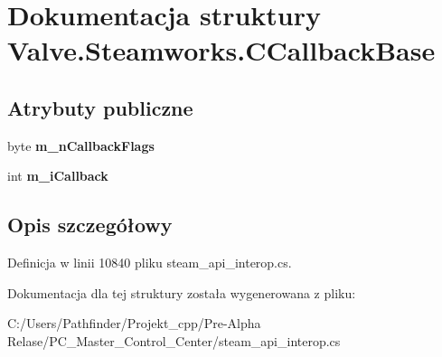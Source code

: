 \hypertarget{struct_valve_1_1_steamworks_1_1_c_callback_base}{}\section{Dokumentacja struktury Valve.\+Steamworks.\+C\+Callback\+Base}
\label{struct_valve_1_1_steamworks_1_1_c_callback_base}
\subsection*{Atrybuty publiczne}
\begin{DoxyCompactItemize}
\item 
\mbox{\label{struct_valve_1_1_steamworks_1_1_c_callback_base_a96bf2321a7c7d75c528d671eca3024c7}} 
byte {\bfseries m\+\_\+n\+Callback\+Flags}
\item 
\mbox{\label{struct_valve_1_1_steamworks_1_1_c_callback_base_a6a6836d718108094ed6ec0986f2f57ff}} 
int {\bfseries m\+\_\+i\+Callback}
\end{DoxyCompactItemize}


\subsection{Opis szczegółowy}


Definicja w linii 10840 pliku steam\+\_\+api\+\_\+interop.\+cs.



Dokumentacja dla tej struktury została wygenerowana z pliku\+:\begin{DoxyCompactItemize}
\item 
C\+:/\+Users/\+Pathfinder/\+Projekt\+\_\+cpp/\+Pre-\/\+Alpha Relase/\+P\+C\+\_\+\+Master\+\_\+\+Control\+\_\+\+Center/steam\+\_\+api\+\_\+interop.\+cs\end{DoxyCompactItemize}
